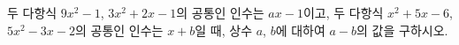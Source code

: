 두 다항식 $9x^2-1$, $3x^2+2x-1$의 공통인 인수는 $ax-1$이고, 두 다항식 $x^2+5x-6$, $5x^2-3x-2$의 공통인 인수는 $x+b$일 때, 상수 $a$, $b$에 대하여 $a-b$의 값을 구하시오.
